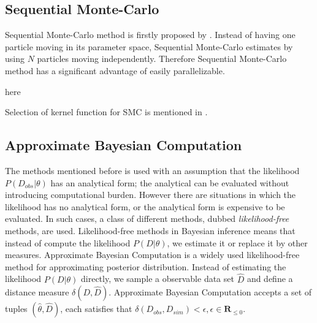 \subsection{Sequential Monte-Carlo}
Sequential Monte-Carlo method is firstly proposed by \cite{del2006sequential}.  Instead of having
one particle moving in its parameter space, Sequential Monte-Carlo estimates by using $N$ particles
moving independently. Therefore Sequential Monte-Carlo method has a significant advantage of easily
parallelizable.

here \cite{daviet2018inference}

Selection of kernel function for SMC is mentioned in \cite{silk2012optimizing}.

\subsection{Approximate Bayesian Computation}
The methods mentioned before is used with an assumption that the likelihood $P(D_{obs}|\theta)$ has
an analytical form; the analytical can be evaluated without introducing computational burden.
However there are situations in which the likelihood has no analytical form, or the analytical form
is expensive to be evaluated. In such cases, a class of different methods, dubbed
\textit{likelihood-free} methods, are used. Likelihood-free methods in Bayesian inference means that
instead of compute the likelihood $P(D|\theta)$, we estimate it or replace it by other measures.
Approximate Bayesian Computation is a widely used likelihood-free method for approximating posterior
distribution. Instead of estimating the likelihood $P(D|\theta)$ directly, we sample a observable
data set $\hat{D}$ and define a distance measure $\delta(D, \hat{D})$. Approximate Bayesian
Computation accepts a set of tuples $(\hat{\theta}, \hat{D})$, each satisfies that
$\delta(D_{obs},D_{sim}) < \epsilon, \epsilon\in\mathbf{R}_{\leq 0}$.
